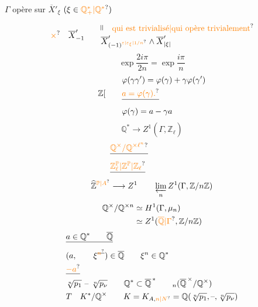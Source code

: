 \quad $\Gamma$ opère sur
$\overline{X}'_\xi$ \quad $(\xi\in\unsure{\mathbb Q_{+}^*|\mathbb Q^*})$

\[
\unsure{\times}\quad\overline{X}'_{-1}
\qquad
\begin{aligned}
&\rotatebox{90}{$=$}\quad\text{\unsure{qui est trivialisé|qui opère trivialement}}\\[-2pt]
&\overline{X}'_{(-1)^{\unsure{\varepsilon|\varepsilon_\xi|1/n}}}\mathbin{\wedge}\overline{X}'_{|\xi|}
\end{aligned}
\]
\[
\exp\frac{2i\pi}{2n}=\exp\frac{i\pi}{n}
\]
\[
\begin{aligned}
&\varphi(\gamma\gamma')=\varphi(\gamma)+\gamma\varphi(\gamma')\\
\mathbb Z[\qquad &\deleted{\unsure{a=\varphi(\gamma).}}\\
&\varphi(\gamma)=a-\gamma a
\end{aligned}
\]
\[
\mathbb Q^*\longrightarrow Z^1(\Gamma,\widehat{\mathbb Z}_\ell)
\]
\[
\begin{aligned}
&\deleted{\unsure{\mathbb Q^\times/\mathbb Q^{\times\ell^n}}}\\
&\deleted{\unsure{\mathbb Z_\ell^{\mathbb P}|\mathbb Z^{\mathbb P}|\mathbb Z_\ell}}\\
\widehat{\mathbb Z}^{\unsure{\mathbb P|A}}&\longrightarrow Z^1
\qquad \varprojlim_n Z^1(\Gamma,\mathbb Z/n\mathbb Z)
\end{aligned}
\]
\[
\begin{aligned}
\mathbb Q^\times/\mathbb Q^{\times n}&\simeq H^1(\Gamma,\mu_n)\\
&\simeq Z^1(\unsure{\overline{\mathbb Q}|\Gamma},\mathbb Z/n\mathbb Z)
\end{aligned}
\]
\[
\begin{aligned}
&\deleted{a\in\mathbb Q^*\qquad\overline{\mathbb Q}}\\
&(a,\qquad \xi^{\deleted{\unsure{n}}})\in\overline{\mathbb Q}\qquad \xi^n\in\mathbb Q^*\\
&\deleted{\unsure{-a}}\qquad\\[-5pt]
&\sqrt[n]{p_1}\ \text{--}\ \sqrt[n]{p_\nu}
\qquad\mathbb Q^*\subset\overline{\mathbb Q}^{\,*}\qquad {}_n(\overline{\mathbb Q}^{\,\times}/\mathbb Q^\times)\\
&T\quad K^*/\mathbb Q^\times
\qquad K=K_{A,\unsure{n|N}}=\mathbb Q(\sqrt[n]{p_1},\text{--},\sqrt[n]{p_\nu})
\end{aligned}
\]

